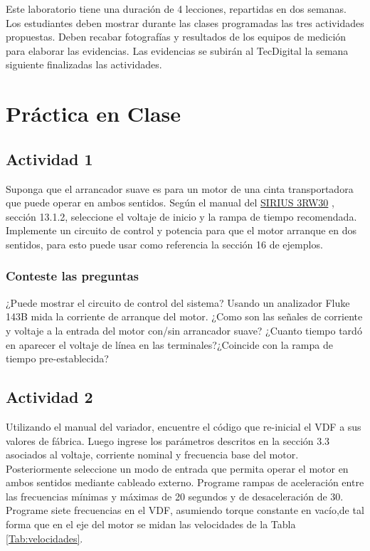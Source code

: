 Este laboratorio tiene una duración de 4 lecciones, repartidas en dos semanas. Los estudiantes deben mostrar durante las clases programadas las tres actividades propuestas. Deben recabar fotografías y resultados de los equipos de medición para elaborar las evidencias. Las evidencias se subirán al TecDigital la semana siguiente finalizadas las actividades.

\section{Práctica en Clase}

\subsection{Actividad 1}

Suponga que el arrancador suave es para un motor de una cinta transportadora que puede operar en ambos sentidos. Según el manual del \href{https://support.industry.siemens.com/dl/files/095/38752095/att_1310813/v1/Manual_softstarter_3RW30_3RW40_es-MX.pdf}{SIRIUS 3RW30} \cite{SIEMENS}, sección 13.1.2, seleccione el voltaje de inicio y la rampa de tiempo recomendada.
Implemente un circuito de control y potencia para que el motor arranque en dos sentidos, para esto puede usar como referencia la sección 16 de ejemplos. 
 
\subsubsection{Conteste las preguntas}

¿Puede mostrar el circuito de control del sistema?
Usando un analizador Fluke 143B  mida la corriente de arranque del motor.
¿Como son las señales de corriente y voltaje a la entrada del motor con/sin arrancador suave?
¿Cuanto tiempo tardó en aparecer el voltaje de línea en las terminales?¿Coincide con la rampa de tiempo pre-establecida?

\subsection{Actividad 2}
 

Utilizando el manual del variador, encuentre el código que re-inicial el VDF a sus valores de fábrica.
Luego ingrese los parámetros descritos en la sección 3.3 asociados al voltaje, corriente nominal y frecuencia base del motor.
Posteriormente seleccione un modo de entrada que permita operar el motor en ambos sentidos mediante cableado externo.
Programe rampas de aceleración entre las frecuencias mínimas y máximas de 20 segundos y de desaceleración de 30.
Programe siete frecuencias en el VDF, asumiendo torque constante en vacío,de tal forma que en el eje del motor se midan las velocidades de la Tabla \ref{Tab:velocidades}.


